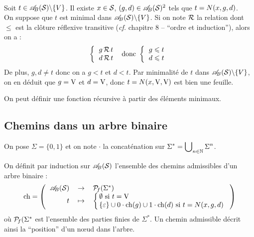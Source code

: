 			\eqskip{2mm}
			\begin{Preuve}
				\\[-4mm]
				\ii Soit \(t\in\AB(\cal{S})\backslash\{V\}\). Il existe \(x\in\cal{S}\), \((g,d)\in\AB(\cal{S})^2\) tels que \(t = \N(x,g,d)\). \\
				On suppose que \(t\) est minimal dans \(\AB(\cal{S})\backslash\{V\}\). Si on note \(\cal{R}\) la relation dont \(\leqslant\) est la clôture réflexive transitive (\emph{cf.} chapitre 8 -- ``ordre et induction''), alors on a : \colsep{1.5pt}
					\[
						\left\{\begin{tabular}[h]{l} \(g \,\cal{R}\, t\) \\ \(d \,\cal{R}\, t\)\end{tabular}\right. \text{ donc } \left\{\begin{tabular}[h]{l} \(g \leqslant t\) \\ \(d \leqslant t\)\end{tabular}\right.
					\]
				De plus, \(g,d \neq t\) donc on a \(g < t\) et \(d < t\). Par minimalité de \(t\) dans \(\AB(\cal{S})\backslash\{V\}\), on en déduit que \(g = \V\) et \(d = \V\), donc \(t = \N(x,\V,\V)\) est bien une feuille. \nt
				\iii
			\end{Preuve}
		
		\begin{Corollaire}[]
			On peut définir une fonction récursive à partir des éléments minimaux.
		\end{Corollaire}
	
	\subsection{Chemins dans un arbre binaire}
	
		On pose \(\Sigma = \{0,1\}\) et on note \(\cdot\) la concaténation sur \(\displaystyle \Sigma^* = \bigcup\nolimits_{n\in\bb{N}} \Sigma^n\).
		
		\eqskip{3mm}
		\colsep{2.2pt}
		\begin{Definition}
			On définit par induction sur \(\AB(\cal{S})\) l'ensemble des chemins admissibles d'un arbre binaire :
				\[
					\ch = \fun{\AB(\cal{S})}{\cal{P}_{\!f}(\Sigma^*)}{t}{\colsep{1.5pt}
						\left\{ \begin{tabular}[h]{l}
							\(\emptyset\) si \(t = \V\) \\
							\(\{\varepsilon\} \cup 0\cdot \ch(g) \cup 1\cdot \ch(d)\) si \(t = \N(x,g,d)\)
						\end{tabular} \right.
					}
				\]
			où \(\cal{P}_{\!f}(\Sigma^*\) est l'ensemble des parties finies de \(\Sigma^*\). \nt
			Un chemin admissible décrit ainsi la ``position'' d'un n\oe ud dans l'arbre.
		\end{Definition}
		
